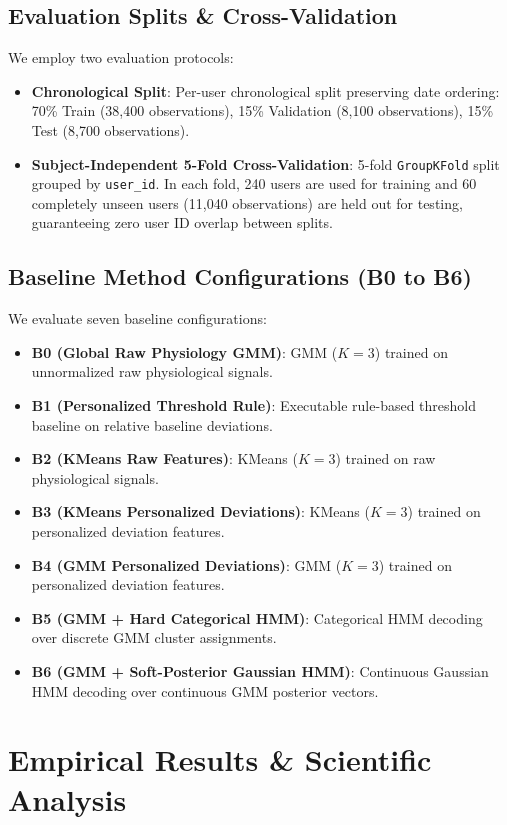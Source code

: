 \documentclass[conference]{IEEEtran}
\begin{document}
\subsection{Evaluation Splits & Cross-Validation}
We employ two evaluation protocols:
\begin{itemize}
    \item \textbf{Chronological Split}: Per-user chronological split preserving date ordering: 70\% Train (38,400 observations), 15\% Validation (8,100 observations), 15\% Test (8,700 observations).
    \item \textbf{Subject-Independent 5-Fold Cross-Validation}: 5-fold \texttt{GroupKFold} split grouped by \texttt{user\_id}. In each fold, 240 users are used for training and 60 completely unseen users (11,040 observations) are held out for testing, guaranteeing zero user ID overlap between splits.
\end{itemize}

\subsection{Baseline Method Configurations (B0 to B6)}
We evaluate seven baseline configurations:
\begin{itemize}
    \item \textbf{B0 (Global Raw Physiology GMM)}: GMM ($K=3$) trained on unnormalized raw physiological signals.
    \item \textbf{B1 (Personalized Threshold Rule)}: Executable rule-based threshold baseline on relative baseline deviations.
    \item \textbf{B2 (KMeans Raw Features)}: KMeans ($K=3$) trained on raw physiological signals.
    \item \textbf{B3 (KMeans Personalized Deviations)}: KMeans ($K=3$) trained on personalized deviation features.
    \item \textbf{B4 (GMM Personalized Deviations)}: GMM ($K=3$) trained on personalized deviation features.
    \item \textbf{B5 (GMM + Hard Categorical HMM)}: Categorical HMM decoding over discrete GMM cluster assignments.
    \item \textbf{B6 (GMM + Soft-Posterior Gaussian HMM)}: Continuous Gaussian HMM decoding over continuous GMM posterior vectors.
\end{itemize}

\section{Empirical Results \& Scientific Analysis}
\end{document}
